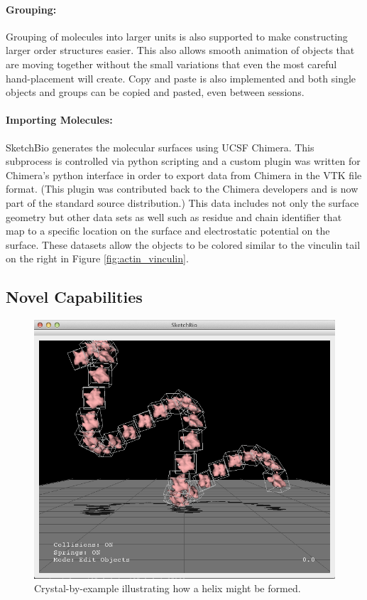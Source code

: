 \documentclass[twocolumn]{bmcart}%
\begin{document}
\paragraph*{Grouping:}
Grouping of molecules into larger units is also supported to make constructing larger order structures easier.  This also allows smooth animation of objects that are moving together without the small variations that even the most careful hand-placement will create.  Copy and paste is also implemented and both single objects and groups can be copied and pasted, even between sessions.

\paragraph*{Importing Molecules:}
SketchBio generates the molecular surfaces using UCSF Chimera.  This subprocess is controlled via python scripting and a custom plugin was written for Chimera's python interface in order to export data from Chimera in the VTK file format.  (This plugin was contributed back to the Chimera developers and is now part of the standard source distribution.)  This data includes not only the surface geometry but other data sets as well such as residue and chain identifier that map to a specific location on the surface and electrostatic potential on the surface.  These datasets allow the objects to be colored similar to the vinculin tail on the right in Figure \ref{fig:actin_vinculin}.

\subsection*{Novel Capabilities}

\begin{figure}[h]
\centering
\includegraphics[width=0.9\columnwidth]{crystalByExample.png}
\caption{Crystal-by-example illustrating how a helix might be formed.}
\label{fig:crystal_by_example}
\end{figure}
\end{document}
